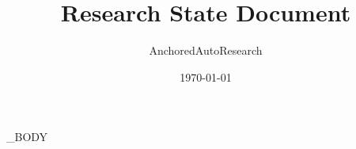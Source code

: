 \documentclass[11pt, a4paper]{article}
\title{Research State Document}
\author{AnchoredAutoResearch}
\date{\today}
\begin{document}
\INPUT_BODY
\end{document}
